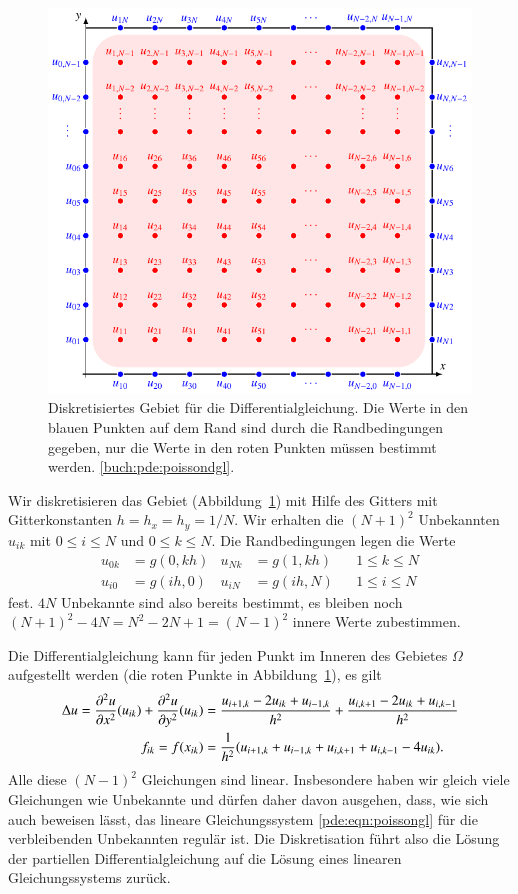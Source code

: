 \begin{figure}
\centering
\includegraphics{chapters/70-pde/images/poisson.pdf}
\caption{Diskretisiertes Gebiet für die Differentialgleichung.
Die Werte in den blauen Punkten auf dem Rand sind durch die Randbedingungen
gegeben, nur die Werte in den roten Punkten müssen bestimmt werden.
\eqref{buch:pde:poissondgl}.
\label{buch:pde:poissongebiet}}
\end{figure}
Wir diskretisieren das Gebiet (Abbildung~\ref{buch:pde:poissongebiet})
mit Hilfe des Gitters mit Gitterkonstanten
$h=h_x=h_y=1/N$.
Wir erhalten die $(N+1)^2$ Unbekannten $u_{ik}$ mit $0\le i\le N$ und 
$0\le k\le N$.
Die Randbedingungen legen die Werte
\begin{align*}
u_{0k}&= g(0, kh)
&
u_{Nk}&= g(1, kh)
&&1\le k\le N
\\
u_{i0}&=g(ih,0)
&
u_{iN}&=g(ih,N)
&&
1\le i\le N
\end{align*}
fest.
$4N$ Unbekannte sind also bereits bestimmt, es bleiben noch
$(N+1)^2-4N = N^2-2N+1=(N-1)^2$ innere Werte zubestimmen.

Die Differentialgleichung kann für jeden Punkt im Inneren des Gebietes
$\Omega$ aufgestellt werden (die roten Punkte in
Abbildung~\ref{buch:pde:poissongebiet}), es gilt
\begin{align}
\Delta u
=
\frac{\partial^2 u}{\partial x^2}(u_{ik})
+
\frac{\partial^2 u}{\partial y^2}(u_{ik})
&=
\frac{u_{i+1,k}-2u_{ik}+u_{i-1,k}}{h^2}
+
\frac{u_{i,k+1}-2u_{ik}+u_{i,k-1}}{h^2}
\notag
\\
f_{ik}=f(x_{ik})
&=
\frac{1}{h^2} ( u_{i+1,k} + u_{i-1,k} + u_{i,k+1} + u_{i,k-1} - 4u_{ik}).
\label{pde:eqn:poissongl}
\end{align}
Alle diese $(N-1)^2$ Gleichungen sind linear.
Insbesondere haben wir gleich viele Gleichungen wie Unbekannte und 
dürfen daher davon ausgehen, dass, wie sich auch beweisen lässt, das
lineare Gleichungssystem
\eqref{pde:eqn:poissongl} 
für die verbleibenden Unbekannten regulär ist.
Die Diskretisation führt also die Lösung der partiellen Differentialgleichung
auf die Lösung eines linearen Gleichungssystems zurück.



